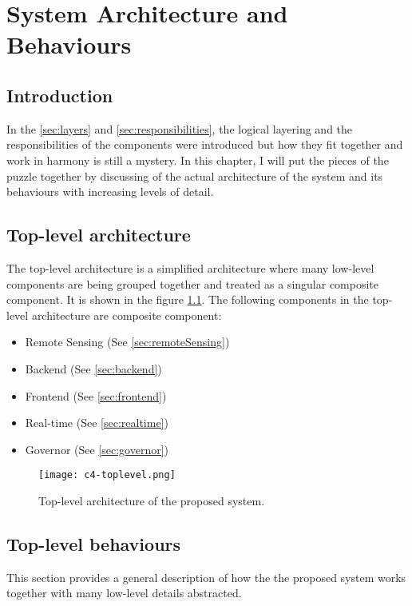 \documentclass[../thesis.tex]{subfiles}
\begin{document}
\chapter{System Architecture and Behaviours}
\label{chap:arch}

\section{Introduction}

In the \autoref{sec:layers} and \autoref{sec:responsibilities}, the logical layering and the responsibilities of the components were introduced but how they fit together and work in harmony is still a mystery. In this chapter, I will put the pieces of the puzzle together by discussing of the actual architecture of the system and its behaviours with increasing levels of detail. 


\section{Top-level architecture}

The top-level architecture is a simplified architecture where many low-level components are being grouped together and treated as a singular composite component. It is shown in the figure \ref{fig:toplevel}. The following components in the top-level architecture are composite component:

\begin{itemize}
	\item Remote Sensing (See \autoref{sec:remoteSensing})
	\item Backend (See \autoref{sec:backend})
	\item Frontend (See \autoref{sec:frontend})
	\item Real-time (See \autoref{sec:realtime})
	\item Governor (See \autoref{sec:governor})
\end{itemize}


\begin{figure}[!ht]
	\centering
	\texttt{[image: c4-toplevel.png]}
	\caption{Top-level architecture of the proposed system.}
	\label{fig:toplevel}
\end{figure}

\section{Top-level behaviours}

This section provides a general description of how the the proposed system works together with many low-level details abstracted. 
\end{document}

